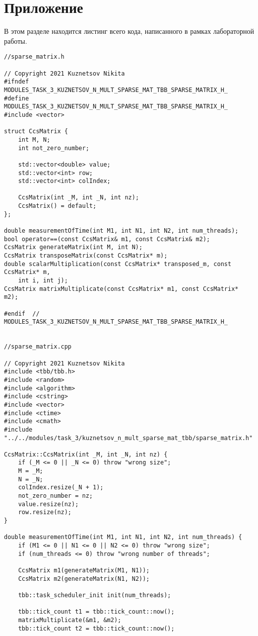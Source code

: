 \documentclass{report}
\begin{document}
\section*{Приложение}
В этом разделе находится листинг всего кода, написанного в рамках лабораторной работы.
\begin{lstlisting}
//sparse_matrix.h

// Copyright 2021 Kuznetsov Nikita
#ifndef MODULES_TASK_3_KUZNETSOV_N_MULT_SPARSE_MAT_TBB_SPARSE_MATRIX_H_
#define MODULES_TASK_3_KUZNETSOV_N_MULT_SPARSE_MAT_TBB_SPARSE_MATRIX_H_
#include <vector>

struct CcsMatrix {
    int M, N;
    int not_zero_number;

    std::vector<double> value;
    std::vector<int> row;
    std::vector<int> colIndex;

    CcsMatrix(int _M, int _N, int nz);
    CcsMatrix() = default;
};

double measurementOfTime(int M1, int N1, int N2, int num_threads);
bool operator==(const CcsMatrix& m1, const CcsMatrix& m2);
CcsMatrix generateMatrix(int M, int N);
CcsMatrix transposeMatrix(const CcsMatrix* m);
double scalarMultiplication(const CcsMatrix* transposed_m, const CcsMatrix* m,
    int i, int j);
CcsMatrix matrixMultiplicate(const CcsMatrix* m1, const CcsMatrix* m2);

#endif  // MODULES_TASK_3_KUZNETSOV_N_MULT_SPARSE_MAT_TBB_SPARSE_MATRIX_H_


//sparse_matrix.cpp

// Copyright 2021 Kuznetsov Nikita
#include <tbb/tbb.h>
#include <random>
#include <algorithm>
#include <cstring>
#include <vector>
#include <ctime>
#include <cmath>
#include "../../modules/task_3/kuznetsov_n_mult_sparse_mat_tbb/sparse_matrix.h"

CcsMatrix::CcsMatrix(int _M, int _N, int nz) {
    if (_M <= 0 || _N <= 0) throw "wrong size";
    M = _M;
    N = _N;
    colIndex.resize(_N + 1);
    not_zero_number = nz;
    value.resize(nz);
    row.resize(nz);
}

double measurementOfTime(int M1, int N1, int N2, int num_threads) {
    if (M1 <= 0 || N1 <= 0 || N2 <= 0) throw "wrong size";
    if (num_threads <= 0) throw "wrong number of threads";

    CcsMatrix m1(generateMatrix(M1, N1));
    CcsMatrix m2(generateMatrix(N1, N2));

    tbb::task_scheduler_init init(num_threads);

    tbb::tick_count t1 = tbb::tick_count::now();
    matrixMultiplicate(&m1, &m2);
    tbb::tick_count t2 = tbb::tick_count::now();


\end{lstlisting}
\end{document}
